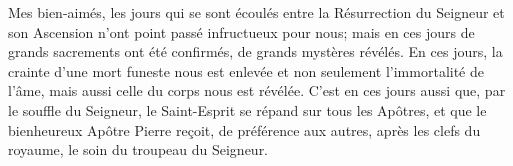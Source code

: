 Mes bien-aimés, les jours qui se sont écoulés
		entre la Résurrection du Seigneur et son Ascension
	n’ont point passé infructueux pour nous;
	mais en ces jours de grands sacrements ont été confirmés,
	de grands mystères révélés.
En ces jours, la crainte d’une mort funeste nous est enlevée
	et non seulement l’immortalité de l’âme, mais aussi celle du corps
		nous est révélée.
C’est en ces jours aussi que, par le souffle du Seigneur,
	le Saint-Esprit se répand sur tous les Apôtres,
	et que le bienheureux Apôtre Pierre reçoit, de préférence aux autres,
	après les clefs du royaume, le soin du troupeau du Seigneur.
